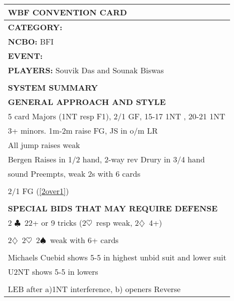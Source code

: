 \documentclass{article}
\newcommand\C{\ensuremath{\clubsuit}}
\newcommand\D{\ensuremath{\diamondsuit}}
\renewcommand\H{\ensuremath{\heartsuit}}
\renewcommand\S{\ensuremath{\spadesuit}}
\begin{document}
\begin{minipage}{5mm}
	\begin{tabular}{| p{5mm} |}
	\end{tabular}
\end{minipage}
\begin{minipage}{90mm}
	\begin{tabular}{| p{88mm} |}
		\hline
		\cellcolor[gray]{0.9} \textbf{WBF CONVENTION CARD} \\ \hline
		\textbf{CATEGORY:} \\
		\textbf{NCBO:} BFI \\
		\textbf{EVENT:} \\
		\textbf{PLAYERS:} Souvik Das and Sounak Biswas \\
		\multirow{2}{*}{} \\
		\\
		\cellcolor[gray]{0.9} \textbf{SYSTEM SUMMARY} \\ \hline
		\textbf{GENERAL APPROACH AND STYLE} \\ \hline
                5 card Majors (1NT resp F1), 2/1 GF, 15-17 1NT , 20-21 1NT
                \\ \hline
                3+ minors. 1m-2m raise FG, JS in o/m LR
                \\ \hline
                All jump raises weak
		\\ \hline
                Bergen Raises in 1/2 hand, 2-way rev Drury in 3/4 hand
		\\ \hline 
                sound Preempts, weak 2s with 6 cards 
		\\ \hline
		\\ \hline
                2/1 FG (\ref{2over1})
		\\ \hline
		\\ \hline
		\textbf{SPECIAL BIDS THAT MAY REQUIRE DEFENSE} \\ \hline
                2 \C\ 22+ or 9 tricks (2\H\ resp weak, 2\D\ 4+)
		\\ \hline
		\\ \hline
                2\D\, 2\H\, 2\S\ weak with 6+ cards
		\\ \hline
		\\ \hline
                Michaels Cuebid shows 5-5 in highest unbid suit and lower suit
		\\ \hline
                U2NT shows 5-5 in lowers
		\\ \hline
		\\ \hline
                LEB after a)1NT interference, b) openers Reverse

\end{tabular}
\end{minipage}
\end{document}
